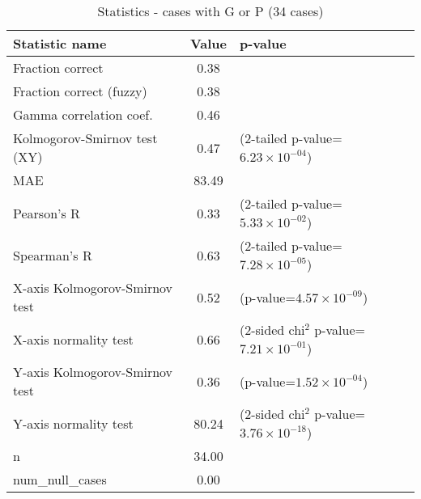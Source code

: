 \documentclass[10pt, letterpaper, oneside, titlepage, landscape]{scrreprt}
\begin{document}
\begin{table}[H]\begin{center}
\begin{tabular}{ l S[table-format=3.2] l}
Statistic name & {Value} & p-value\\
\hline
Fraction correct & 0.38 & \\
Fraction correct (fuzzy) & 0.38 & \\
Gamma correlation coef. & 0.46 & \\
Kolmogorov-Smirnov test (XY) & 0.47 & (2-tailed p-value=$6.23\times10^{-04}$)\\
MAE & 83.49 & \\
Pearson's R & 0.33 & (2-tailed p-value=$5.33\times10^{-02}$)\\
Spearman's R & 0.63 & (2-tailed p-value=$7.28\times10^{-05}$)\\
X-axis Kolmogorov-Smirnov test & 0.52 & (p-value=$4.57\times10^{-09}$)\\
X-axis normality test & 0.66 & (2-sided chi$^{2}$ p-value=$7.21\times10^{-01}$)\\
Y-axis Kolmogorov-Smirnov test & 0.36 & (p-value=$1.52\times10^{-04}$)\\
Y-axis normality test & 80.24 & (2-sided chi$^{2}$ p-value=$3.76\times10^{-18}$)\\
n & 34.00 & \\
num\_null\_cases & 0.00 & \\
\end{tabular}
\caption{Statistics - cases with G or P (34 cases)}
\end{center}\end{table}
\end{document}
